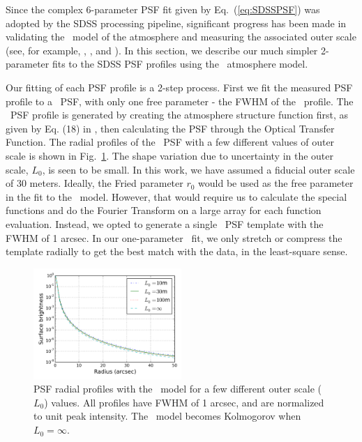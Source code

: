 

Since the complex 6-parameter PSF fit given by Eq.~(\ref{eq:SDSSPSF}) was adopted by 
the SDSS processing pipeline, significant progress has been made in validating the 
\vk~model of the atmosphere and measuring the associated outer
scale (see, for example, \citealt{Tokovinin2002}, \citealt{Boccas2004}, and \citealt{MartinezMessenger}).
In this section, we describe our much simpler 2-parameter fits to the SDSS PSF
profiles using the \vk~atmosphere model.

Our fitting of each PSF profile is a 2-step process. First we fit the
measured PSF profile to a \vk~PSF, with only one free parameter -
the FWHM of the \vk~profile.  The \vk~PSF profile is generated by creating the atmosphere
structure function first, as given by Eq. (18) in \cite{Tokovinin2002}, then calculating the
PSF through the Optical Transfer Function. 
The radial profiles of the \vk~PSF with a few different values of
outer scale is shown in Fig.~\ref{fig:vonK}.
The shape variation due to uncertainty in the outer scale, $L_0$, is seen to
be small.
In this work, we have assumed a fiducial
outer scale of 30 meters.
Ideally, the Fried parameter $r_0$ would be used as the free
parameter in the fit to the \vk~model. However, 
that would require us to calculate the special functions and do the
Fourier Transform on a large array for each function evaluation.
Instead, we opted to generate a single \vk~PSF template with the FWHM of 
1 arcsec. In our one-parameter \vk~fit, we only stretch or compress
the template radially to get the best match with the data, in the
least-square sense.

\begin{figure}
\centering
\includegraphics[width=0.5\textwidth]{FIGURES/vonK.png}
\caption{PSF radial profiles with the \vk~model for a few different
  outer scale ($L_0$) values. All profiles have FWHM of 1 arcsec, and
  are normalized to unit peak intensity. The \vk~model becomes
  Kolmogorov when $L_0 = \infty$.
\label{fig:vonK}}
\end{figure}


